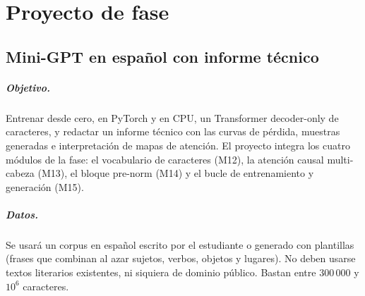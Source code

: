 \chapter{Proyecto de fase}
\label{chap:proyecto}

\section*{Mini-GPT en español con informe técnico}

\paragraph{Objetivo.} Entrenar desde cero, en PyTorch y en CPU, un Transformer decoder-only de caracteres, y redactar un informe técnico con las curvas de pérdida, muestras generadas e interpretación de mapas de atención. El proyecto integra los cuatro módulos de la fase: el vocabulario de caracteres (M12), la atención causal multi-cabeza (M13), el bloque pre-norm (M14) y el bucle de entrenamiento y generación (M15).

\paragraph{Datos.} Se usará un corpus en español escrito por el estudiante o generado con plantillas (frases que combinan al azar sujetos, verbos, objetos y lugares). No deben usarse textos literarios existentes, ni siquiera de dominio público. Bastan entre $300\,000$ y $10^{6}$ caracteres.

